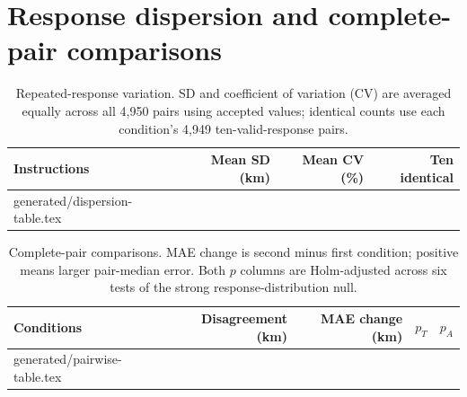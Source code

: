 \documentclass[12pt,a4paper]{article}
\makeatletter
\newcommand{\tableinput}[1]{\@@input #1 }
\makeatother
\begin{document}
\section{Response dispersion and complete-pair comparisons}\label{app:additional}
\begin{table}[htbp]\centering\small
\caption{Repeated-response variation. SD and coefficient of variation (CV) are averaged equally across all 4,950 pairs using accepted values; identical counts use each condition's 4,949 ten-valid-response pairs.}\label{tab:dispersion}
\begin{tabular}{lrrr}\toprule Instructions & Mean SD (km) & Mean CV (\%) & Ten identical \\\midrule
\tableinput{generated/dispersion-table.tex}
\bottomrule\end{tabular}
\end{table}

\begin{table}[htbp]\centering\small
\caption{Complete-pair comparisons. MAE change is second minus first condition; positive means larger pair-median error. Both $p$ columns are Holm-adjusted across six tests of the strong response-distribution null.}\label{tab:pairwise}
\begin{tabular}{lrrrr}\toprule Conditions & Disagreement (km) & MAE change (km) & $p_T$ & $p_A$ \\\midrule
\tableinput{generated/pairwise-table.tex}
\bottomrule\end{tabular}
\end{table}
\end{document}
